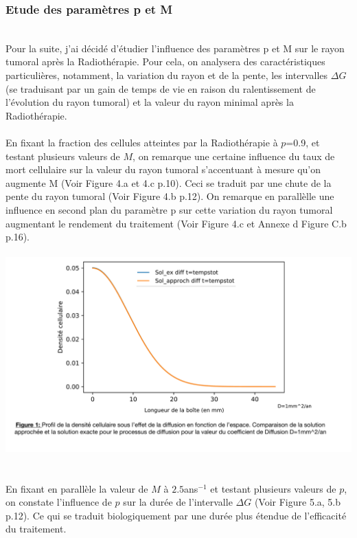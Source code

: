 \documentclass[12pt,a4paper]{article}
\begin{document}
\subsubsection{Etude des paramètres p et M}
\\
Pour la suite, j'ai décidé d'étudier l'influence des paramètres p et M sur le rayon tumoral après la Radiothérapie. 
Pour cela, on analysera des caractéristiques particulières, notamment, la variation du rayon et de la pente, les intervalles $\Delta G$ (se traduisant par un gain de temps de vie en raison du ralentissement de l'évolution du rayon tumoral) et la valeur du rayon minimal après la Radiothérapie.
\\
\\
En fixant la fraction des cellules atteintes par la Radiothérapie à $p$=0.9, et testant plusieurs valeurs de $M$, on remarque une certaine influence du taux de mort cellulaire sur la valeur du rayon tumoral s'accentuant à mesure qu'on augmente M (Voir Figure 4.a et 4.c p.10). Ceci se traduit par une chute de la pente du rayon tumoral (Voir Figure 4.b p.12). On remarque en parallèlle une influence en second plan du paramètre p sur cette variation du rayon tumoral augmentant le rendement du traitement (Voir Figure 4.c et Annexe d Figure C.b p.16). 
\\
\\
\includegraphics[page=4,scale=0.23]{FIGURES.pdf}
\\
\\
\\
En fixant en parallèle la valeur de $M$ à $2.5$ans$^{-1}$ et testant plusieurs valeurs de $p$, on constate l'influence de $p$ sur la durée de l'intervalle $\Delta G$ (Voir Figure 5.a, 5.b p.12). Ce qui se traduit biologiquement par une durée plus étendue de l'efficacité du traitement. \\
\end{document}
